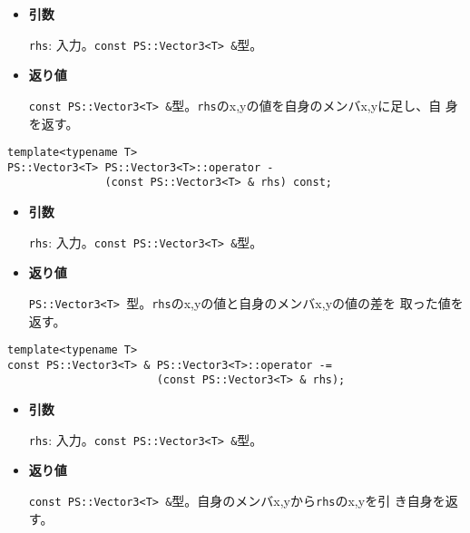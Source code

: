 \begin{itemize}

\item{{\bf 引数}}

{\tt rhs}: 入力。{\tt const PS::Vector3<T> \&}型。

\item{{\bf 返り値}}

{\tt const PS::Vector3<T> \&}型。{\tt rhs}のx,yの値を自身のメンバx,yに足し、自
身を返す。

\end{itemize}


\begin{screen}
\begin{verbatim}
template<typename T>
PS::Vector3<T> PS::Vector3<T>::operator - 
               (const PS::Vector3<T> & rhs) const;
\end{verbatim}
\end{screen}

\begin{itemize}

\item{{\bf 引数}}

{\tt rhs}: 入力。{\tt const PS::Vector3<T> \&}型。

\item{{\bf 返り値}}

{\tt PS::Vector3<T> }型。{\tt rhs}のx,yの値と自身のメンバx,yの値の差を
取った値を返す。

\end{itemize}


\begin{screen}
\begin{verbatim}
template<typename T>
const PS::Vector3<T> & PS::Vector3<T>::operator -= 
                       (const PS::Vector3<T> & rhs);
\end{verbatim}
\end{screen}

\begin{itemize}

\item{{\bf 引数}}

{\tt rhs}: 入力。{\tt const PS::Vector3<T> \&}型。

\item{{\bf 返り値}}

{\tt const PS::Vector3<T> \&}型。自身のメンバx,yから{\tt rhs}のx,yを引
き自身を返す。

\end{itemize}

